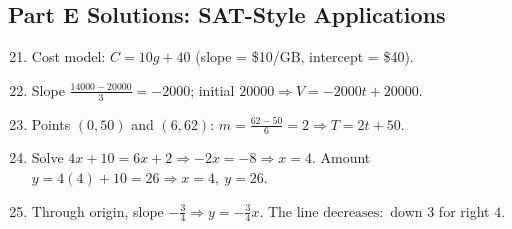 \documentclass[14pt]{extarticle}
\begin{document}
\subsection*{Part E Solutions: SAT-Style Applications}
\begin{enumerate}
    \setcounter{enumi}{20}
    \item Cost model: \(\boxed{C=10g+40}\) (slope = \$10/GB, intercept = \$40).
    \item Slope \(\frac{14000-20000}{3}=-2000\); initial \(20000\Rightarrow \boxed{V=-2000t+20000}\).
    \item Points \((0,50)\) and \((6,62)\): \(m=\frac{62-50}{6}=2\Rightarrow \boxed{T=2t+50}\).
    \item Solve \(4x+10=6x+2\Rightarrow -2x=-8\Rightarrow x=4\). Amount \(y=4(4)+10=26\Rightarrow \boxed{x=4,\ y=26}\).
    \item Through origin, slope \(-\tfrac34\Rightarrow \boxed{y=-\tfrac34 x}\). The line \(\boxed{\text{decreases}}:\) down \(3\) for right \(4\).
\end{enumerate}




\end{document}
